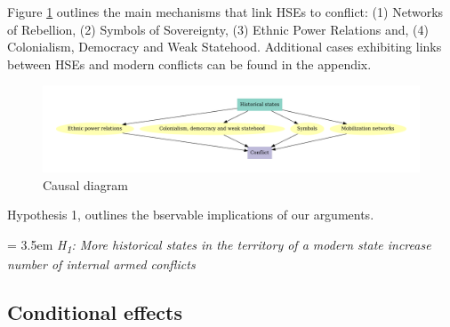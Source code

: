 \bigskip

Figure \ref{Fig: CausalDiagram} outlines the main mechanisms that link HSEs to
conflict: (1) Networks of Rebellion, (2) Symbols of Sovereignty, (3) Ethnic
Power Relations and, (4) Colonialism, Democracy and Weak Statehood. Additional
cases exhibiting links between HSEs and modern conflicts can be found in the
appendix.

\begin{figure}[!htb] 
	\includegraphics[width=\textwidth]{img/graf.pdf} 
	\caption{Causal diagram}
	\label{Fig: CausalDiagram}
\end{figure}

Hypothesis 1, outlines the bservable implications of our arguments. 

\bigskip

\hangindent = 3.5em \textit{H\textsubscript{1}: More historical states in the
territory of a modern state increase number of internal armed conflicts}

\subsection{Conditional effects}

